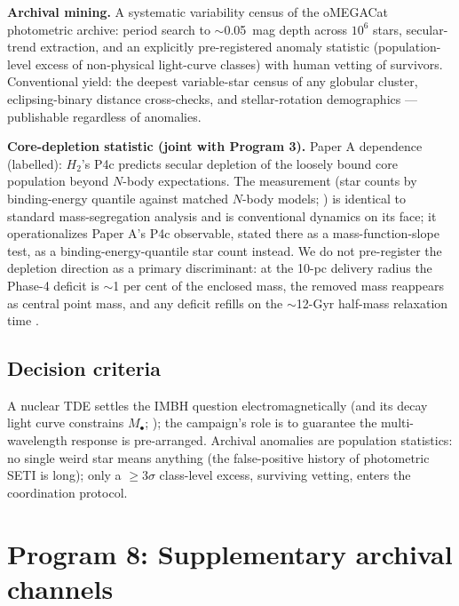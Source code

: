 \documentclass[11pt]{article}
\begin{document}
\textbf{Archival mining.} A systematic variability census of the oMEGACat photometric archive: period search to $\sim$0.05~mag depth across $10^{6}$ stars, secular-trend extraction, and an explicitly pre-registered anomaly statistic (population-level excess of non-physical light-curve classes) with human vetting of survivors. Conventional yield: the deepest variable-star census of any globular cluster, eclipsing-binary distance cross-checks, and stellar-rotation demographics --- publishable regardless of anomalies.

\textbf{Core-depletion statistic (joint with Program 3).} Paper A dependence (labelled): $H_2$'s P4c predicts secular depletion of the loosely bound core population beyond $N$-body expectations. The measurement (star counts by binding-energy quantile against matched $N$-body models; \citealt{GonzalezPrieto2025}) is identical to standard mass-segregation analysis and is conventional dynamics on its face; it operationalizes Paper A's P4c observable, stated there as a mass-function-slope test, as a binding-energy-quantile star count instead. We do not pre-register the depletion direction as a primary discriminant: at the 10-pc delivery radius the Phase-4 deficit is $\sim$1 per cent of the enclosed mass, the removed mass reappears as central point mass, and any deficit refills on the $\sim$12-Gyr half-mass relaxation time \citep{Swanson2026Engineered}.

\subsection{Decision criteria}

A nuclear TDE settles the IMBH question electromagnetically (and its decay light curve constrains $M_{\bullet}$; \citealt{Gezari2021}); the campaign's role is to guarantee the multi-wavelength response is pre-arranged. Archival anomalies are population statistics: no single weird star means anything (the false-positive history of photometric SETI is long); only a $\geq 3\sigma$ class-level excess, surviving vetting, enters the coordination protocol.

\section{Program 8: Supplementary archival channels}
\label{sec:archival}
\end{document}
